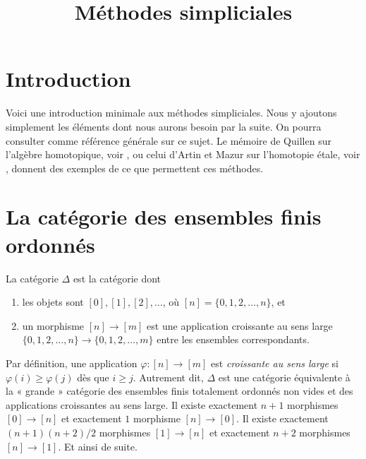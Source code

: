 

%


\title{Méthodes simpliciales}


\maketitle

\label{section-phantom}

\tableofcontents

\section{Introduction}
\label{section-introduction}

\noindent
Voici une introduction minimale aux méthodes simpliciales.
Nous y ajoutons simplement les éléments dont nous aurons besoin par la suite.
On pourra consulter \cite{SimpHom} comme référence générale sur ce sujet.
Le mémoire de Quillen sur l'algèbre homotopique, voir \cite{Quillen},
ou celui d'Artin et Mazur sur l'homotopie étale, voir \cite{ArtinMazur},
donnent des exemples de ce que permettent ces méthodes.

\section{La catégorie des ensembles finis ordonnés}
\label{section-Delta}

\noindent
La catégorie $\Delta$ est la catégorie dont
\begin{enumerate}
\item les objets sont $[0], [1], [2], \ldots$, où
$[n] = \{0, 1, 2, \ldots, n\}$, et
\item un morphisme $[n] \to [m]$ est une application croissante au sens large
$\{0, 1, 2, \ldots, n\} \to \{0, 1, 2, \ldots, m\}$
entre les ensembles correspondants.
\end{enumerate}
Par définition, une application $\varphi : [n] \to [m]$ est
{\it croissante au sens large} si $\varphi(i) \geq \varphi(j)$ dès que
$i \geq j$. Autrement dit, $\Delta$ est une catégorie équivalente à la
« grande » catégorie des ensembles finis totalement ordonnés non vides et
des applications croissantes au sens large.
Il existe exactement $n + 1$ morphismes $[0] \to [n]$ et exactement $1$
morphisme $[n] \to [0]$. Il existe exactement $(n + 1)(n + 2)/2$
morphismes $[1] \to [n]$ et exactement $n + 2$ morphismes
$[n] \to [1]$. Et ainsi de suite.

